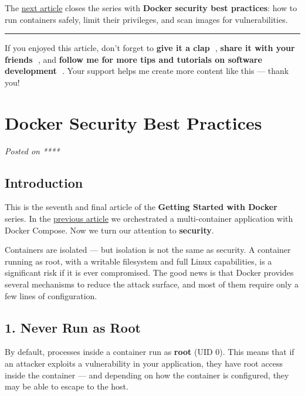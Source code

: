 \documentclass[11pt,american,a4paper,openany]{book}
\begin{document}
The
\href{/Users/sasadangelo/github.com/sasadangelo/code4projects/docker-security-best-practices/}{next
article} closes the series with \textbf{Docker security best practices}:
how to run containers safely, limit their privileges, and scan images
for vulnerabilities.

\begin{center}\rule{0.5\linewidth}{0.5pt}\end{center}

If you enjoyed this article, don't forget to \textbf{give it a clap 👏},
\textbf{share it with your friends 🔗}, and \textbf{follow me for more
tips and tutorials on software development 📘}. Your support helps me
create more content like this --- thank you! 🙌

\section{Docker Security Best
Practices}\label{docker-security-best-practices}

\emph{Posted on ****}

\subsection{Introduction}\label{introduction-6}

This is the seventh and final article of the \textbf{Getting Started
with Docker} series. In the
\href{/Users/sasadangelo/github.com/sasadangelo/code4projects/how-docker-compose-works-2025/}{previous
article} we orchestrated a multi-container application with Docker
Compose. Now we turn our attention to \textbf{security}.

Containers are isolated --- but isolation is not the same as security. A
container running as root, with a writable filesystem and full Linux
capabilities, is a significant risk if it is ever compromised. The good
news is that Docker provides several mechanisms to reduce the attack
surface, and most of them require only a few lines of configuration.

\subsection{1. Never Run as Root}\label{never-run-as-root}

By default, processes inside a container run as \textbf{root} (UID 0).
This means that if an attacker exploits a vulnerability in your
application, they have root access inside the container --- and
depending on how the container is configured, they may be able to escape
to the host.
\end{document}
